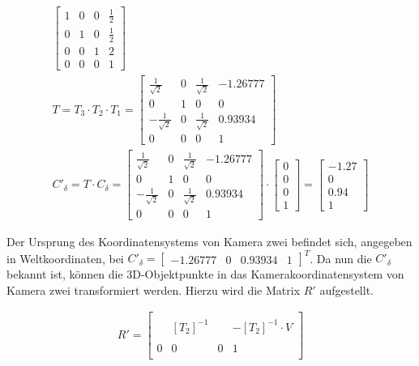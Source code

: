 \begin{gather}
\begin{bmatrix}
		1&0&0&\frac{1}{2}\\
		0&1&0&\frac{1}{2}\\
		0&0&1&2\\
		0&0&0&1
	\end{bmatrix}\\
	T= 
	T_3 \cdot T_2 \cdot T_1
	= 
	\begin{bmatrix}
		\frac{1}{\sqrt{2}}&0&\frac{1}{\sqrt{2}}&-1.26777\\
		0&1&0&0\\
		-\frac{1}{\sqrt{2}}&0&\frac{1}{\sqrt{2}}&0.93934\\
		0&0&0&1
	\end{bmatrix}\\
	C'_\delta = T \cdot C_\delta
	= 	
	\begin{bmatrix}
		\frac{1}{\sqrt{2}}&0&\frac{1}{\sqrt{2}}&-1.26777\\
		0&1&0&0\\
		-\frac{1}{\sqrt{2}}&0&\frac{1}{\sqrt{2}}&0.93934\\
		0&0&0&1
	\end{bmatrix} \cdot 
	\begin{bmatrix}
		0\\0\\0\\1
	\end{bmatrix}
	=
	\begin{bmatrix}
		-1.27\\0\\0.94\\1
	\end{bmatrix}	
\end{gather} 

Der Ursprung des Koordinatensystems von Kamera zwei befindet sich, angegeben in Weltkoordinaten, bei $C'_\delta =\begin{bmatrix}-1.26777&0&0.93934&1\end{bmatrix}^T$. Da nun die $C'_\delta$ bekannt ist, können die 3D-Objektpunkte in das Kamerakoordinatensystem von Kamera zwei transformiert werden. Hierzu wird die Matrix $R'$ aufgestellt.

\begin{gather}
	R' = \begin{bmatrix}
		&&&\\
		&[T_2]^{-1}&& -[T_2]^{-1} \cdot V\\
		&&&\\
		0&0&0&1\\
	\end{bmatrix}
\end{gather}

